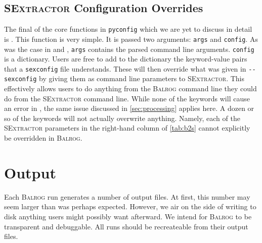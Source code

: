 \documentclass[11pt]{book}
\newcommand{\codett}[1]{\lstinline{#1}}
\newcommand{\pyconfig}{\codett{pyconfig}}
\newcommand{\balrog}{\textsc{Balrog}}
\newcommand{\sex}{\textsc{SExtractor}}
\newcommand{\opt}[1]{\codett{--#1}}
\begin{document}
\section{\sex{} Configuration Overrides}
\label{sec:sexoverride}

The final of the core functions in \pyconfig{} which we are yet to discuss in detail is \sexfunc{}.
This function is very simple. It is passed two arguments: \codett{args} and \codett{config}.
As was the case in \simfunc{} and \gspfunc{}, \codett{args} contains the parsed command line arguments.
\codett{config} is a dictionary. Users are free to add to the dictionary the keyword-value pairs
that a \codett{sexconfig} file understands. These will then override what was given in \opt{sexconfig}
by giving them as command line parameters to \sex{}.
This effectively allows users to do anything from the \balrog{} command line they could do from the \sex{} command line.
While none of the keywords will cause an error in \sexfunc{}, 
the same issue discussed in \autoref{sec:processing} applies here.
A dozen or so of the keywords will not actually overwrite anything.
Namely, each of the \sex{} parameters in the right-hand column of \autoref{tab:b2s} cannot explicitly be overridden in \balrog{}.



\chapter{Output}
\label{sec:out}
Each \balrog{} run generates a number of output files. 
At first, this number may seem larger than was perhaps expected.
However, we air on the side of writing to disk anything users might possibly want afterward.
We intend for \balrog{} to be transparent and debuggable.
All runs should be recreateable from their output files.
\end{document}
